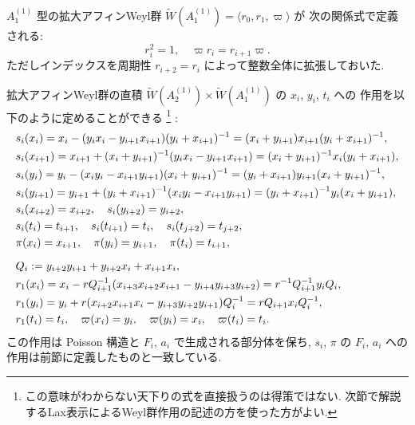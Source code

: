 \documentclass[12pt,twoside,dvipdfm]{msjproc}
\theoremstyle{definition} %
\theoremstyle{definition} %
\theoremstyle{definition} %
\numberwithin{theorem}{section}
\numberwithin{equation}{section}
\numberwithin{figure}{section}
\numberwithin{table}{section}
\newcommand\bra{\langle}
\newcommand\ket{\rangle}
\newcommand\WW{\widetilde{W}}
\begin{document}
$A^{(1)}_1$ 型の拡大アフィンWeyl群 $\WW(A^{(1)}_1)=\bra r_0,r_1,\varpi\ket$ が
次の関係式で定義される:
\begin{equation*}
 r_i^2=1, \quad
 \varpi r_i = r_{i+1} \varpi.
\end{equation*}
ただしインデックスを周期性 $r_{i+2}=r_i$ によって整数全体に拡張しておいた. 

拡大アフィンWeyl群の直積 $\WW(A^{(1)}_2)\times\WW(A^{(1)}_1)$ の $x_i$, $y_i$, $t_i$ への
作用を以下のように定めることができる%
\footnote{この意味がわからない天下りの式を直接扱うのは得策ではない. 
次節で解説するLax表示によるWeyl群作用の記述の方を使った方がよい.}%
:
\begin{align*}
 &
 s_i(x_i) 
 = x_i - (y_i x_i - y_{i+1}x_{i+1})(y_i+x_{i+1})^{-1}
 = (x_i+y_{i+1})x_{i+1}(y_i+x_{i+1})^{-1},
 \\ &
 s_i(x_{i+1})
 = x_{i+1} +(x_i+y_{i+1})^{-1}(y_i x_i - y_{i+1}x_{i+1})
 =(x_i+y_{i+1})^{-1} x_i (y_i+x_{i+1}),
 \\ &
 s_i(y_i) 
 = y_i - (x_i y_i - x_{i+1}y_{i+1})(x_i+y_{i+1})^{-1}
 = (y_i+x_{i+1})y_{i+1}(x_i+y_{i+1})^{-1},
 \\ &
  s_i(y_{i+1})
 = y_{i+1} +(y_i+x_{i+1})^{-1}(x_i y_i - x_{i+1}y_{i+1})
 =(y_i+x_{i+1})^{-1} y_i (x_i+y_{i+1}),
 \\ &
 s_i(x_{i+2})=x_{i+2},
 \quad
 s_i(y_{i+2})=y_{i+2}, 
 \\ &
 s_i(t_i)=t_{i+1},  \quad
 s_i(t_{i+1})=t_i,  \quad
 s_i(t_{j+2})=t_{j+2},
 \\ &
 \pi(x_i) = x_{i+1},  \quad
 \pi(y_i) = y_{i+1},  \quad
 \pi(t_i) = t_{i+1},
 \\[\medskipamount] &
 Q_i := y_{i+2}y_{i+1} + y_{i+2}x_i + x_{i+1}x_i, 
 \\ &
 r_1(x_i) 
 = x_i - r Q_{i+1}^{-1}(x_{i+3}x_{i+2}x_{i+1}-y_{i+4}y_{i+3}y_{i+2})
 = r^{-1} Q_{i+1}^{-1}y_i Q_i,
 \\ &
 r_1(y_i)
 = y_i + r(x_{i+2}x_{i+1}x_i-y_{i+3}y_{i+2}y_{i+1})Q_i^{-1}
 = r Q_{i+1} x_i Q_i^{-1},
 \\ &
 r_1(t_i) = t_i, \quad
 \varpi(x_i)=y_i,   \quad
 \varpi(y_i)=x_i,   \quad
 \varpi(t_i)=t_i.
\end{align*}
この作用は Poisson 構造と $F_i$, $a_i$ で生成される部分体を保ち, 
$s_i$, $\pi$ の $F_i$, $a_i$ への作用は前節に定義したものと一致している.
\end{document}
